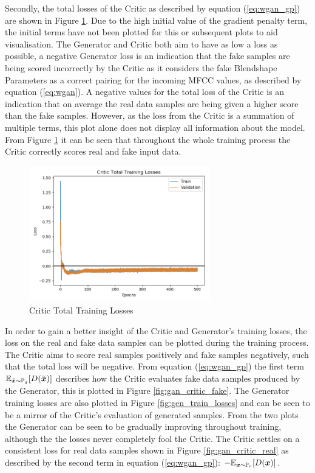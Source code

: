 Secondly, the total losses of the Critic as described by equation (\ref{eq:wgan_gp}) are shown in Figure \ref{fig:gan_total_critic_losses}.
Due to the high initial value of the gradient penalty term, the initial terms have not been plotted for this or subsequent plots to aid visualisation.
The Generator and Critic both aim to have as low a loss as possible, a negative Generator loss is an indication that the fake samples are being scored incorrectly by the Critic as it considers the fake Blendshape Parameters as a correct pairing for the incoming MFCC values, as described by equation (\ref{eq:wgan}).
A negative values for the total loss of the Critic is an indication that on average the real data samples are being given a higher score than the fake samples.
However, as the loss from the Critic is a summation of multiple terms, this plot alone does not display all information about the model.
From Figure \ref{fig:gan_total_critic_losses} it can be seen that throughout the whole training process the Critic correctly scores real and fake input data.

\begin{figure}[h!]
    \centering
        \includegraphics[width=0.7\textwidth]{figures/gan/critic_total_train_losses.png}
    \caption{Critic Total Training Losses}\label{fig:gan_total_critic_losses}
\end{figure} 

In order to gain a better insight of the Critic and Generator's training losses, the loss on the real and fake data samples can be plotted during the training process.
The Critic aims to score real samples positively and fake samples negatively, such that the total loss will be negative.
From equation (\ref{eq:wgan_gp}) the first term $\mathbb{E}_{{\boldsymbol{{\tilde{x}}}} \sim \mathbb{P}_{g}} [D(\tilde{{{\boldsymbol{{x}}}}})]$ describes how the Critic evaluates fake data samples produced by the Generator, this is plotted in Figure \ref{fig:gan_critic_fake}.
The Generator training losses are also plotted in Figure \ref{fig:gen_train_losses} and can be seen to be a mirror of the Critic's evaluation of generated samples.
From the two plots the Generator can be seen to be gradually improving throughout training, although the the losses never completely fool the Critic.
The Critic settles on a consistent loss for real data samples shown in Figure \ref{fig:gan_critic_real} as described by the second term in equation (\ref{eq:wgan_gp}): $- \mathbb{E}_{{\boldsymbol{{x}}} \sim \mathbb{P}_{r}} [D({\boldsymbol{{x}}})]$.


